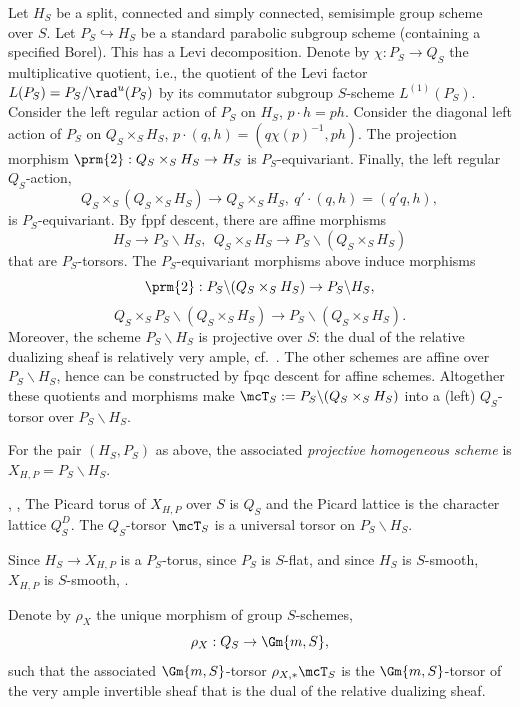  Let $H_S$ be a split, connected and simply connected, semisimple group scheme over $S$. Let $P_S\hookrightarrow H_S$ be a standard parabolic subgroup scheme (containing a specified Borel). This has a Levi decomposition. Denote by $\chi:P_S\to Q_S$ the multiplicative quotient, i.e., the quotient of the Levi factor $L(P_S)=P_S/\rad^u(P_S)$ by its commutator subgroup $S$-scheme $L^{(1)}(P_S)$. Consider the left regular action of $P_S$ on $H_S$, $p\cdot h = ph$. Consider the diagonal left action of $P_S$ on $Q_S\times_S H_S$, $p\cdot (q,h) = (q\chi(p)^{-1},ph)$. The projection morphism $\prm{2}:Q_S\times_S H_S \to H_S$ is $P_S$-equivariant. Finally, the left regular $Q_S$-action,
\[
Q_S \times_S (Q_S\times_S H_S) \to Q_S\times_S H_S, \ q'\cdot (q,h) = (q'q,h),
\]
is $P_S$-equivariant. By fppf descent, there are affine morphisms
\[
H_S \to P_S\backslash H_S, \ \ Q_S\times_S H_S \to P_S\backslash (Q_S\times_S H_S)
\]
that are $P_S$-torsors. The $P_S$-equivariant morphisms above induce morphisms
\[
\prm{2}:P_S\backslash (Q_S\times_S H_S) \to P_S\backslash H_S,
\]
\[
Q_S\times_S P_S\backslash (Q_S\times_S H_S) \to P_S\backslash (Q_S\times_S H_S).
\]
Moreover, the scheme $P_S\backslash H_S$ is projective over $S$: the dual of the relative dualizing sheaf is relatively very ample, cf.~\cite[p.~186]{Demazure-Aut}. The other schemes are affine over $P_S\backslash H_S$, hence can be constructed by fpqc descent for affine schemes. Altogether these quotients and morphisms make $\mcT_S := P_S\backslash (Q_S\times_S H_S)$ into a (left) $Q_S$-torsor over $P_S\backslash H_S$.

\begin{defi} \label{defn-PHS}
For the pair $(H_S,P_S)$ as above, the associated \emph{projective homogeneous scheme} is $X_{H,P} = P_S\backslash H_S.$
\end{defi}

\begin{lemm}
\cite[Construction 5.3]{Zhu}, \cite[Lemma~2.2$\MK$(vi)]{BCTSk}, 
\cite[Lemma~6.4]{GilleSII}\label{lem-UT}
The Picard torus of $X_{H,P}$ over $S$ is $Q_S$ and the Picard lattice is the character lattice $Q_S^D$. The $Q_S$-torsor $\mcT_S$ is a universal torsor on $P_S\backslash H_S$.
\end{lemm}

Since $H_S\to X_{H,P}$ is a $P_S$-torus, since $P_S$ is $S$-flat, and since $H_S$ is $S$-smooth, $X_{H,P}$ is $S$-smooth, \cite[Proposition~17.7.7]{EGA4}.

\begin{nota}\label{notat-rho}
Denote by $\rho_X$ the unique morphism of group $S$-schemes,
\[
\rho_X:Q_S \to \Gm{m,S},
\]
such that the associated $\Gm{m,S}$-torsor $\rho_{X,*}\mcT_S$ is the $\Gm{m,S}$-torsor of the very ample invertible sheaf that is the dual of the relative dualizing sheaf.
\end{nota}

